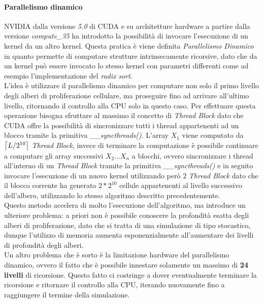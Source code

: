 \paragraph{Parallelismo dinamico}

NVIDIA dalla versione \textit{5.0} di CUDA e su architetture hardware a partire
dalla versione \textit{compute\_35} ha introdotto la possibilità di invocare
l'esecuzione di un kernel da un altro kernel.
Questa pratica è viene definita
\textit{Parallelismo Dinamico}\cite{jones2012introduction} in quanto permette
di computare strutture intrinsecamente ricorsive, dato che da un kernel può
essere invocato lo stesso kernel con parametri differenti come ad 
esempio l'implementazione del \textit{radix sort}\cite{merrill2011high}.
\\
L'idea è utilizzare il parallelismo dinamico per computare non solo il primo
livello degli alberi di proliferazione cellulare, ma proseguire fino ad arrivare
all'ultimo livello, ritornando il controllo alla CPU solo in questo caso.
Per effettuare questa operazione bisogna sfruttare al massimo il concetto di
\textit{Thread Block} dato che CUDA offre la possibilità di sincronizzare
tutti i thread appartenenti ad un blocco tramite la primitiva
\textit{\_\_syncthreads()}\cite{jones2012introduction}.
L'array $X_{1}$ viene computato da $\ceil*{L/2^{10}}$ \textit{Thread Block},
invece di terminare la computazione è possibile continuare a computare
gli array successivi $X_{2}...X_{n}$ a blocchi, ovvero sincronizzare i thread
all'interno di un \textit{Thread Block} tramite la primitiva
\textit{\_\_syncthreads()} e in seguito invocare l'esecuzione di un nuovo kernel
utilizzando però $2$ \textit{Thread Block} dato che il blocco corrente ha
generato $2 * 2^{10}$ cellule appartenenti al livello successivo dell'albero,
utilizzando lo stesso algoritmo descritto precedentemente.
\\
Questo metodo accelera di molto l'esecuzione dell'algoritmo, ma introduce un
ulteriore problema: a priori non è possibile conoscere la profondità esatta
degli alberi di proliferazione, dato che si tratta di una simulazione
di tipo stocastico, dunque l'utilizzo di memoria aumenta esponenzialmente
all'aumentare dei livelli di profondità degli alberi.
\\
Un altro problema che è sorto è la limitazione hardware del parallelismo
dinamico, ovvero il fatto che è possibile innestare solamente un massimo
di \textbf{24 livelli} di ricorsione. Questo fatto ci costringe a dover
eventualmente terminare la ricorsione e ritornare il controllo alla CPU,
iterando nuovamente fino a raggiungere il termine della simulazione.

